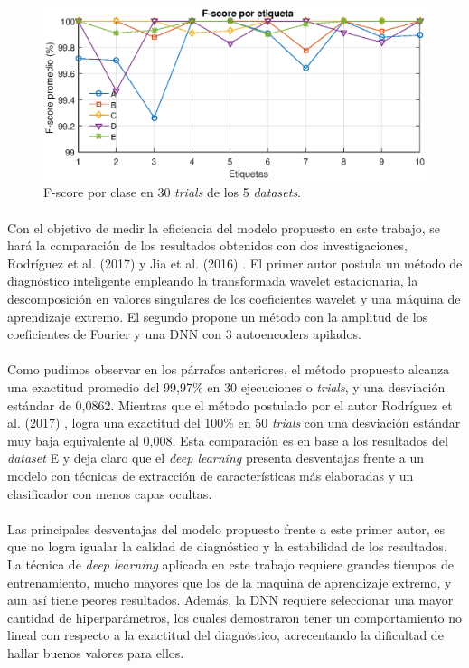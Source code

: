 \documentclass[a4paper,12pt]{article}
\begin{document}
\begin{figure}[ht]
  \centering
    \includegraphics[scale=0.9]{./Fsc.eps}
  \caption{F-score por clase en 30 \textit{trials} de los 5 \textit{datasets}.}
  \label{fig:fsc}
\end{figure}

\paragraph{}
Con el objetivo de medir la eficiencia del modelo propuesto en este trabajo, se hará la comparación de los resultados obtenidos con dos investigaciones, Rodríguez et al. (2017) \cite{nibaldo} y Jia et al. (2016) \cite{jia} . El primer autor postula un método de diagnóstico inteligente empleando la transformada wavelet estacionaria, la descomposición en valores singulares de los coeficientes wavelet y una máquina de aprendizaje extremo. El segundo propone un método con la amplitud de los coeficientes de Fourier y una DNN con 3 autoencoders apilados.

\paragraph{}
Como pudimos observar en los párrafos anteriores, el método propuesto alcanza una exactitud promedio del 99,97\% en 30 ejecuciones o \textit{trials}, y una desviación estándar de 0,0862. Mientras que el método postulado por el autor Rodríguez et al. (2017) \cite{nibaldo}, logra una exactitud del 100\% en 50 \textit{trials} con una desviación estándar muy baja equivalente al 0,008. Esta comparación es en base a los resultados del \textit{dataset} E y deja claro que el \textit{deep learning} presenta desventajas frente a un modelo con técnicas de extracción de características más elaboradas y un clasificador con menos capas ocultas.

\paragraph{}
Las principales desventajas del modelo propuesto frente a este primer autor, es que no logra igualar la calidad de diagnóstico y la estabilidad de los resultados. La técnica de \textit{deep learning} aplicada en este trabajo requiere grandes tiempos de entrenamiento, mucho mayores que los de la maquina de aprendizaje extremo, y aun así tiene peores resultados. Además, la DNN requiere seleccionar una mayor cantidad de hiperparámetros, los cuales demostraron tener un comportamiento no lineal con respecto a la exactitud del diagnóstico, acrecentando la dificultad de hallar buenos valores para ellos.  
\end{document}
